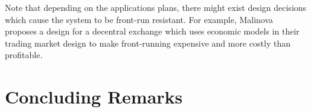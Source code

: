 
Note that depending on the applications plans, there might exist design decisions which cause the system to be front-run resistant. For example, Malinova~\cite{Malinova} proposes a design for a decentral exchange which uses economic models in their trading market design to make front-running expensive and more costly than profitable.









\section{Concluding Remarks}





